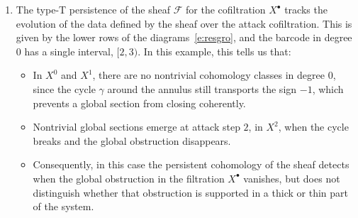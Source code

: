 \documentclass[reqno,12pt]{amsart}
\newcommand{\0}{\mathbf 0}
\theoremstyle{definition}
\begin{document}
\begin{enumerate}
\item The type-T persistence of the sheaf $\mathcal F$ for the cofiltration $X^\bullet$ tracks the evolution of the data defined by the sheaf over the attack cofiltration. This is given by the lower rows of the diagrams~\eqref{e:resgro}, and the barcode in degree $0$ has a single interval, $[2,3)$. In this example, this tells us that:

\begin{itemize}[leftmargin=2em]
\item In \(X^0\) and \(X^1\), there are no nontrivial cohomology classes in degree \(0\), since the cycle $\gamma$ around the annulus still transports the sign \(-1\), which prevents a global section from closing coherently.
\item Nontrivial global sections emerge at attack step $2$, in \(X^2\), when the cycle breaks and the global obstruction disappears.
\item Consequently, in this case the persistent cohomology of the sheaf detects when the global obstruction in the filtration $X^\bullet$ vanishes, but does not distinguish whether that obstruction is supported in a thick or thin part of the system.
\end{itemize}


\end{enumerate}
\end{document}
